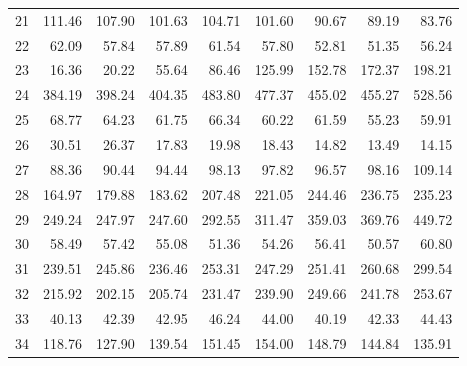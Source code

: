 \begin{table}[]
\begin{tabular}{l|rrrrrrrr}
		21 & 111.46 & 107.90 & 101.63 & 104.71 & 101.60 & 90.67 & 89.19 & 83.76 \\
		22 & 62.09 & 57.84 & 57.89 & 61.54 & 57.80 & 52.81 & 51.35 & 56.24 \\
		23 & 16.36 & 20.22 & 55.64 & 86.46 & 125.99 & 152.78 & 172.37 & 198.21 \\
		24 & 384.19 & 398.24 & 404.35 & 483.80 & 477.37 & 455.02 & 455.27 & 528.56 \\
		25 & 68.77 & 64.23 & 61.75 & 66.34 & 60.22 & 61.59 & 55.23 & 59.91 \\
		26 & 30.51 & 26.37 & 17.83 & 19.98 & 18.43 & 14.82 & 13.49 & 14.15 \\
		27 & 88.36 & 90.44 & 94.44 & 98.13 & 97.82 & 96.57 & 98.16 & 109.14 \\
		28 & 164.97 & 179.88 & 183.62 & 207.48 & 221.05 & 244.46 & 236.75 & 235.23 \\
		29 & 249.24 & 247.97 & 247.60 & 292.55 & 311.47 & 359.03 & 369.76 & 449.72 \\
		30 & 58.49 & 57.42 & 55.08 & 51.36 & 54.26 & 56.41 & 50.57 & 60.80 \\
		31 & 239.51 & 245.86 & 236.46 & 253.31 & 247.29 & 251.41 & 260.68 & 299.54 \\
		32 & 215.92 & 202.15 & 205.74 & 231.47 & 239.90 & 249.66 & 241.78 & 253.67 \\
		33 & 40.13 & 42.39 & 42.95 & 46.24 & 44.00 & 40.19 & 42.33 & 44.43 \\
		34 & 118.76 & 127.90 & 139.54 & 151.45 & 154.00 & 148.79 & 144.84 & 135.91
	\end{tabular}

\label{tab:Topics_investors_2017-2018}
\end{table}
	
	
	
 

